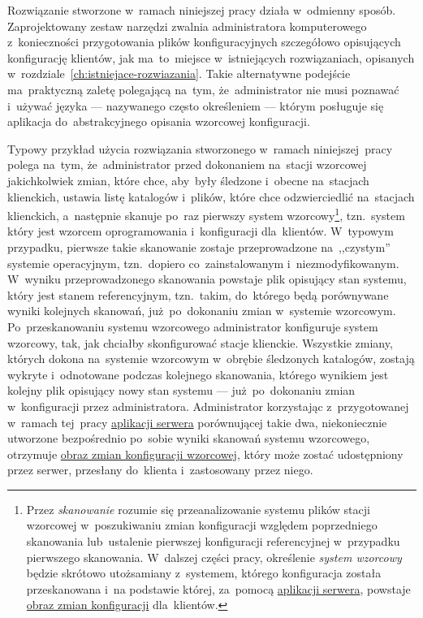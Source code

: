 \documentclass[thesis]{subfiles}
\begin{document}
Rozwiązanie stworzone w~ramach niniejszej pracy działa w~odmienny sposób. Zaprojektowany zestaw narzędzi zwalnia administratora komputerowego z~konieczności przygotowania plików konfiguracyjnych szczegółowo opisujących konfigurację klientów, jak ma~to~miejsce w~istniejących rozwiązaniach, opisanych w~rozdziale~\ref{ch:istniejace-rozwiazania}. Takie alternatywne podejście ma~praktyczną zaletę polegającą na~tym, że~administrator nie musi poznawać i~używać języka --- nazywanego często określeniem  --- którym posługuje się aplikacja do~abstrakcyjnego opisania wzorcowej konfiguracji.

Typowy przykład użycia rozwiązania stworzonego w~ramach niniejszej~pracy polega na~tym, że~administrator przed dokonaniem na~stacji wzorcowej jakichkolwiek zmian, które chce, aby~były śledzone i~obecne na~stacjach klienckich, ustawia listę katalogów i~plików, które chce odzwierciedlić na~stacjach klienckich, a~następnie skanuje po~raz pierwszy system wzorcowy\footnote{Przez \emph{skanowanie} rozumie się przeanalizowanie systemu plików stacji wzorcowej w~poszukiwaniu zmian konfiguracji względem poprzedniego skanowania lub~ustalenie pierwszej konfiguracji referencyjnej w~przypadku pierwszego skanowania. W~dalszej części pracy, określenie \emph{system wzorcowy} będzie skrótowo utożsamiany z~systemem, którego konfiguracja została przeskanowana i~na podstawie której, za~pomocą \hyperref[sec:srv-app]{aplikacji serwera}, powstaje \hyperref[sec:obraz-zmian-konfiguracji]{obraz zmian konfiguracji} dla~klientów.}, tzn.~system który jest wzorcem oprogramowania i~konfiguracji dla~klientów. W~typowym przypadku, pierwsze takie skanowanie zostaje przeprowadzone na~,,czystym'' systemie operacyjnym, tzn.~dopiero co~zainstalowanym i~niezmodyfikowanym. W~wyniku przeprowadzonego skanowania powstaje plik opisujący stan systemu, który jest stanem referencyjnym, tzn.~takim, do~którego będą porównywane wyniki kolejnych skanowań, już~po~dokonaniu zmian w~systemie wzorcowym. Po~przeskanowaniu systemu wzorcowego administrator konfiguruje system wzorcowy, tak, jak chciałby skonfigurować stacje klienckie. Wszystkie zmiany, których dokona na~systemie wzorcowym w~obrębie śledzonych katalogów, zostają wykryte i~odnotowane podczas kolejnego skanowania, którego wynikiem jest kolejny plik opisujący nowy stan systemu --- już~po~dokonaniu zmian w~konfiguracji przez administratora. Administrator korzystając z~przygotowanej w~ramach tej~pracy \hyperref[sec:srv-app]{aplikacji serwera} porównującej takie dwa, niekoniecznie utworzone bezpośrednio po~sobie wyniki skanowań systemu wzorcowego, otrzymuje \hyperref[sec:obraz-zmian-konfiguracji]{obraz zmian konfiguracji wzorcowej}, który może zostać udostępniony przez serwer, przesłany do~klienta i~zastosowany przez niego.%
\end{document}
